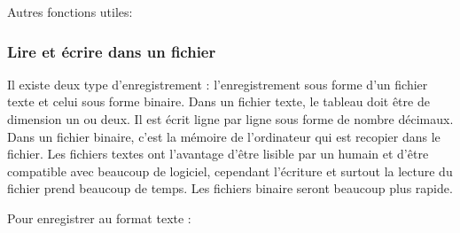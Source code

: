 \documentclass[letterpaper,10pt,english]{sphinxhowto}
\begin{document}
\sphinxAtStartPar
Autres fonctions utiles:

\begin{sphinxVerbatim}[commandchars=\\\{\}]
  
      

  
\end{sphinxVerbatim}


\subsubsection{Lire et écrire dans un fichier}
\label{\detokenize{cours5_numpy_cours:lire-et-ecrire-dans-un-fichier}}
\sphinxAtStartPar
Il existe deux type d’enregistrement : l’enregistrement sous forme d’un fichier texte et celui sous forme binaire. Dans un fichier texte, le tableau doit être de dimension un ou deux. Il est écrit ligne par ligne sous forme de nombre décimaux. Dans un fichier binaire, c’est la mémoire de l’ordinateur qui est recopier dans le fichier. Les fichiers textes ont l’avantage d’être lisible par un humain et d’être compatible avec beaucoup de logiciel, cependant l’écriture et surtout la lecture du fichier prend beaucoup de temps. Les fichiers binaire seront beaucoup plus rapide.

\sphinxAtStartPar
Pour enregistrer au format texte :

\begin{sphinxVerbatim}[commandchars=\\\{\}]
  
  \PYG{p}{[}  \PYG{p}{]}
 
   
\end{sphinxVerbatim}
\end{document}
